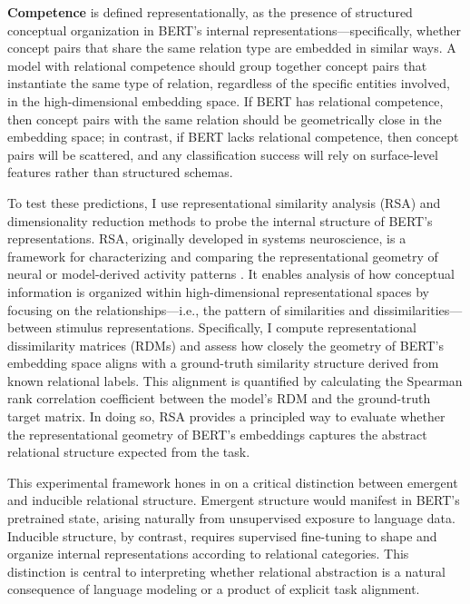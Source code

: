 \documentclass[stu,floatsintext]{apa7}
\begin{document}
\textbf{Competence} is defined representationally, as the presence of structured conceptual organization in BERT's internal representations—specifically, whether concept pairs that share the same relation type are embedded in similar ways. A model with relational competence should group together concept pairs that instantiate the same type of relation, regardless of the specific entities involved, in the high-dimensional embedding space. If BERT has relational competence, then concept pairs with the same relation should be geometrically close in the embedding space; in contrast, if BERT lacks relational competence, then concept pairs will be scattered, and any classification success will rely on surface-level features rather than structured schemas.

To test these predictions, I use representational similarity analysis (RSA) and dimensionality reduction methods to probe the internal structure of BERT's representations. RSA, originally developed in systems neuroscience, is a framework for characterizing and comparing the representational geometry of neural or model-derived activity patterns \parencite{Laakso2000, Kriegeskorte2008, Kriegeskorte2013}. It enables analysis of how conceptual information is organized within high-dimensional representational spaces by focusing on the relationships—i.e., the pattern of similarities and dissimilarities—between stimulus representations. Specifically, I compute representational dissimilarity matrices (RDMs) and assess how closely the geometry of BERT's embedding space aligns with a ground-truth similarity structure derived from known relational labels. This alignment is quantified by calculating the Spearman rank correlation coefficient \parencite{Spearman1904} between the model's RDM and the ground-truth target matrix. In doing so, RSA provides a principled way to evaluate whether the representational geometry of BERT's embeddings captures the abstract relational structure expected from the task.

This experimental framework hones in on a critical distinction between emergent and inducible relational structure. Emergent structure would manifest in BERT’s pretrained state, arising naturally from unsupervised exposure to language data. Inducible structure, by contrast, requires supervised fine-tuning to shape and organize internal representations according to relational categories. This distinction is central to interpreting whether relational abstraction is a natural consequence of language modeling or a product of explicit task alignment.
\end{document}
